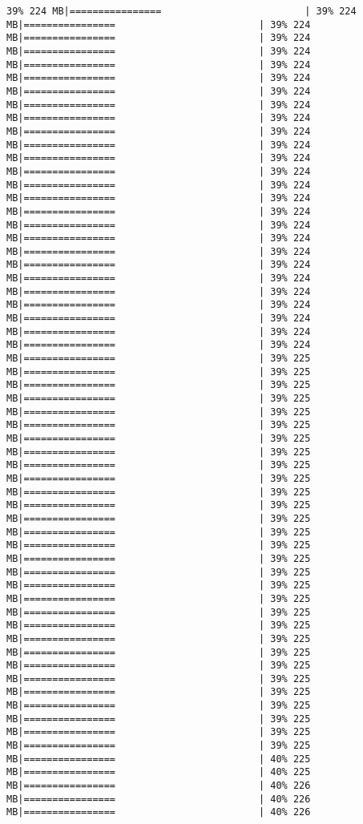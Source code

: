 \documentclass[
]{article}
\begin{document}
\begin{verbatim}
39% 224 MB|================                         | 39% 224 MB|================                         | 39% 224 MB|================                         | 39% 224 MB|================                         | 39% 224 MB|================                         | 39% 224 MB|================                         | 39% 224 MB|================                         | 39% 224 MB|================                         | 39% 224 MB|================                         | 39% 224 MB|================                         | 39% 224 MB|================                         | 39% 224 MB|================                         | 39% 224 MB|================                         | 39% 224 MB|================                         | 39% 224 MB|================                         | 39% 224 MB|================                         | 39% 224 MB|================                         | 39% 224 MB|================                         | 39% 224 MB|================                         | 39% 224 MB|================                         | 39% 224 MB|================                         | 39% 224 MB|================                         | 39% 224 MB|================                         | 39% 224 MB|================                         | 39% 224 MB|================                         | 39% 224 MB|================                         | 39% 224 MB|================                         | 39% 225 MB|================                         | 39% 225 MB|================                         | 39% 225 MB|================                         | 39% 225 MB|================                         | 39% 225 MB|================                         | 39% 225 MB|================                         | 39% 225 MB|================                         | 39% 225 MB|================                         | 39% 225 MB|================                         | 39% 225 MB|================                         | 39% 225 MB|================                         | 39% 225 MB|================                         | 39% 225 MB|================                         | 39% 225 MB|================                         | 39% 225 MB|================                         | 39% 225 MB|================                         | 39% 225 MB|================                         | 39% 225 MB|================                         | 39% 225 MB|================                         | 39% 225 MB|================                         | 39% 225 MB|================                         | 39% 225 MB|================                         | 39% 225 MB|================                         | 39% 225 MB|================                         | 39% 225 MB|================                         | 39% 225 MB|================                         | 39% 225 MB|================                         | 39% 225 MB|================                         | 39% 225 MB|================                         | 39% 225 MB|================                         | 40% 225 MB|================                         | 40% 225 MB|================                         | 40% 226 MB|================                         | 40% 226 MB|================                         | 40% 226 
\end{verbatim}
\end{document}
